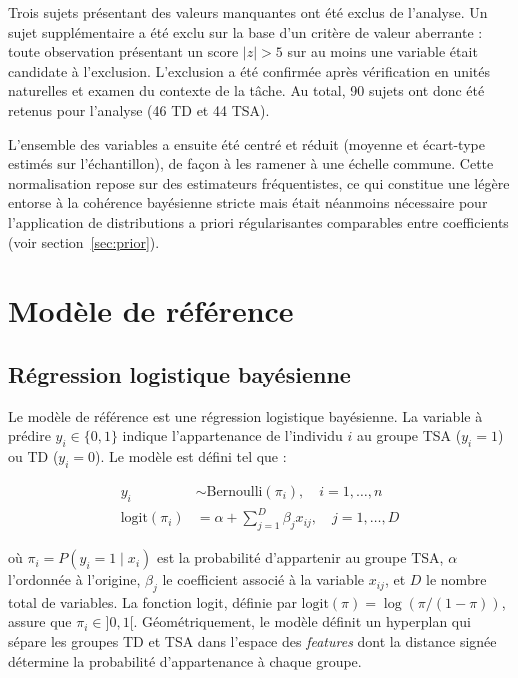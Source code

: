 Trois sujets présentant des valeurs manquantes ont été exclus de l'analyse. Un sujet supplémentaire a été exclu sur la base d'un critère de valeur aberrante : toute observation présentant un score $|z| > 5$ sur au moins une variable était candidate à l'exclusion. L'exclusion a été confirmée après vérification en unités naturelles et examen du contexte de la tâche. Au total, 90 sujets ont donc été retenus pour l'analyse (46 TD et 44 TSA).

\medskip

L'ensemble des variables a ensuite été centré et réduit (moyenne et écart-type estimés sur l'échantillon), de façon à les ramener à une échelle commune. Cette normalisation repose sur des estimateurs fréquentistes, ce qui constitue une légère entorse à la cohérence bayésienne stricte mais était néanmoins nécessaire pour l'application de distributions a priori régularisantes comparables entre coefficients (voir section~\ref{sec:prior}).

\section{Modèle de référence}
\subsection{Régression logistique bayésienne}

Le modèle de référence est une régression logistique bayésienne. La variable à prédire $y_i \in \{0, 1\}$ indique l'appartenance de l'individu $i$ au groupe TSA ($y_i = 1$) ou TD ($y_i = 0$). Le modèle est défini tel que : 

\begin{align*}
	y_i &\sim \text{Bernoulli}(\pi_i), \quad i = 1, \dots, n \\
	\text{logit}(\pi_i) &= \alpha + \sum_{j=1}^{D} \beta_j x_{ij}, 
	\quad j = 1, \dots, D
	\label{eq:vraisemblance}
\end{align*}

où $\pi_i = P(y_i = 1 \mid x_i)$ est la probabilité d'appartenir au groupe TSA, $\alpha$ l'ordonnée à l'origine, $\beta_j$ le coefficient associé à la variable $x_{ij}$, et $D$ le nombre total de variables. La fonction logit, définie par $\text{logit}(\pi) = \log(\pi / (1-\pi))$, assure que $\pi_i \in ]0,1[$. Géométriquement, le modèle définit un hyperplan qui sépare les groupes TD et TSA dans l'espace des \textit{features} dont la distance signée détermine la probabilité d'appartenance à chaque groupe.


